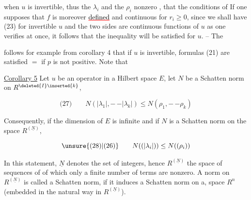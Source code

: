 when $u$ is invertible,  thus  the $\lambda_i$ and the $\rho_i$ nonzero , that the conditions of   If one supposes that $f$ is moreover \textcolor{red}{\uline{\textcolor{black}{defined}}} and continuous for $r_i\geq0$, since we shall have (23) for  invertible $u$ and the two sides are continuous functions of $u$ as one verifies at once, it follows that the inequality will be satisfied for  $u$. -- The

 follows for example from corollary 4 that if $u$ is invertible, formulas (21) are satisfied $=$ if $p$ is not positive. Note that 

\reversemarginpar
{}
\normalmarginpar

\uline{Corollary 5} Let $u$ be an operator in a Hilbert space $E$, let $N$ be a Schatten norm on $R^{\deleted{I}\inserted{k}}$,   

\[
\text{(27)}\qquad N(|\lambda_1|,\mathord{-}\,\mathord{-}|\lambda_k|)\leq N(\rho_1,\mathord{-}\,\mathord{-}\rho_k)
\]

 Consequently, if the dimension of $E$ is infinite and if $N$ is a Schatten norm on  the space $R^{(\underline N)}$,  

\[
\text{\unsure{(28)|(26)}}\qquad N((|\lambda_i|))\leq N((\rho_i))
\]

In this statement, $\underline N$ denotes the set of integers, hence $R^{(\underline N)}$ the space of sequences of   of which only a finite number of terms are nonzero. A norm on $R^{(\underline N)}$ is called a Schatten norm, if it induces a Schatten norm on  a, space $R^n$ (embedded in the natural way in $R^{(\underline N)}$).

\reversemarginpar
{}
\normalmarginpar
